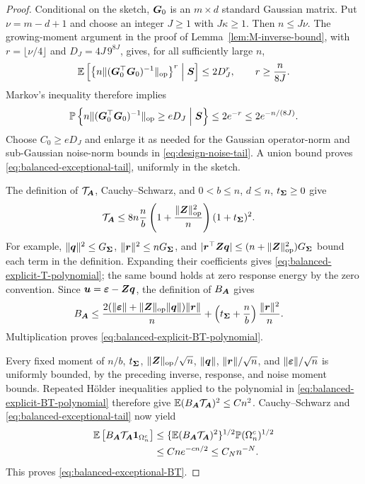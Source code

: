 \documentclass{article}
\theoremstyle{plain} %
\theoremstyle{definition} %
\theoremstyle{definition} %
\begin{document}
\begin{proof}
Conditional on the sketch, $\boldsymbol{G}_0$ is an $m\times d$ standard Gaussian
matrix. Put $\nu=m-d+1$ and choose an integer $J\geq1$ with $J\kappa\geq1$.
Then $n\leq J\nu$. The growing-moment argument in the proof of
Lemma~\ref{lem:M-inverse-bound}, with
$r=\lfloor\nu/4\rfloor$ and
$D_J=4J\,9^{8J}$, gives, for all sufficiently large $n$,
\begin{align*}
    {\mathbb{E}}\left[
       \left\{n\lVert(\boldsymbol{G}_0^\top\boldsymbol{G}_0)^{-1}\rVert_{\rm op}\right\}^{r}
       \mathrel{\Big|}\boldsymbol{S}\right]
       \leq 2D_J^r,
    \qquad r\geq\frac{n}{8J}.
\end{align*}
Markov's inequality therefore implies
\begin{align*}
    {\mathbb{P}}\left\{
       n\lVert(\boldsymbol{G}_0^\top\boldsymbol{G}_0)^{-1}\rVert_{\rm op}\geq eD_J
       \mathrel{\Big|}\boldsymbol{S}\right\}
       \leq2e^{-r}\leq2e^{-n/(8J)}.
\end{align*}
Choose $C_0\geq eD_J$ and enlarge it as needed for the Gaussian operator-norm
and sub-Gaussian noise-norm bounds in \eqref{eq:design-noise-tail}.
A union bound proves \eqref{eq:balanced-exceptional-tail}, uniformly in
the sketch.

The definition of $\mathcal T_{\boldsymbol{A}}$, Cauchy--Schwarz, and
$0<b\leq n$, $d\leq n$, $t_{\boldsymbol{\Sigma}}\geq0$ give
\begin{align}
    \mathcal T_{\boldsymbol{A}}
    &\leq 8n\frac nb
       \left(1+\frac{\lVert\boldsymbol{Z}\rVert_{\rm op}^2}{n}\right)
       (1+t_{\boldsymbol{\Sigma}})^2.
    \label{eq:balanced-explicit-T-polynomial}
\end{align}
For example, $\lVert\boldsymbol{q}\rVert^2\leq G_{\boldsymbol{\Sigma}}$,
$\lVert\boldsymbol{r}\rVert^2\leq nG_{\boldsymbol{\Sigma}}$, and
$|\boldsymbol{r}^\top\boldsymbol{Z}\boldsymbol{q}|\leq(n+\lVert\boldsymbol{Z}\rVert_{\rm op}^2)G_{\boldsymbol{\Sigma}}$
bound each term in the definition. Expanding their coefficients gives
\eqref{eq:balanced-explicit-T-polynomial}; the same bound holds at zero
response energy by the zero convention.
Since $\boldsymbol{u}={\boldsymbol{\varepsilon} }-\boldsymbol{Z}\boldsymbol{q}$, the definition of $B_{\boldsymbol{A}}$ gives
\begin{align*}
    B_{\boldsymbol{A}}
    &\leq
       \frac{2(\lVert{\boldsymbol{\varepsilon} }\rVert+\lVert\boldsymbol{Z}\rVert_{\rm op}\lVert\boldsymbol{q}\rVert)\lVert\boldsymbol{r}\rVert}{n}
       +\left(t_{\boldsymbol{\Sigma}}+\frac nb\right)\frac{\lVert\boldsymbol{r}\rVert^2}{n}.
\end{align*}
Multiplication proves \eqref{eq:balanced-explicit-BT-polynomial}.

Every fixed moment of $n/b$, $t_{\boldsymbol{\Sigma}}$,
$\lVert\boldsymbol{Z}\rVert_{\rm op}/\sqrt n$, $\lVert\boldsymbol{q}\rVert$,
$\lVert\boldsymbol{r}\rVert/\sqrt n$, and $\lVert{\boldsymbol{\varepsilon} }\rVert/\sqrt n$ is uniformly bounded,
by the preceding inverse, response, and noise moment bounds.
Repeated H\"older inequalities applied to the polynomial in
\eqref{eq:balanced-explicit-BT-polynomial} therefore give
${\mathbb{E}}(B_{\boldsymbol{A}}\mathcal T_{\boldsymbol{A}})^2\leq Cn^2$.
Cauchy--Schwarz and \eqref{eq:balanced-exceptional-tail} now yield
\begin{align*}
    {\mathbb{E}}\left[B_{\boldsymbol{A}}\mathcal T_{\boldsymbol{A}}
       \boldsymbol{1}_{\Omega_n^c}\right]
    &\leq \{{\mathbb{E}}(B_{\boldsymbol{A}}\mathcal T_{\boldsymbol{A}})^2\}^{1/2}
       {\mathbb{P}}(\Omega_n^c)^{1/2}\\
    &\leq Cn e^{-cn/2}\leq C_Nn^{-N}.
\end{align*}
This proves \eqref{eq:balanced-exceptional-BT}.
\end{proof}
\end{document}
